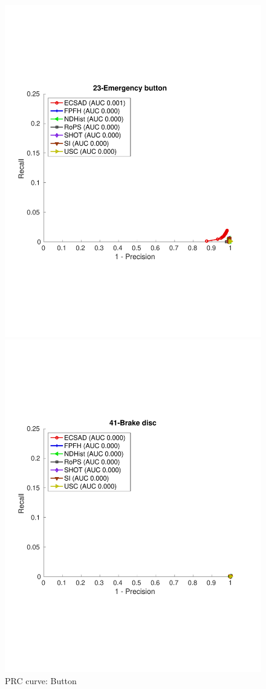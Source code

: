 \documentclass[10pt,twocolumn,letterpaper]{article}
\begin{document}
\begin{figure}[h]
\begin{minipage}[b]{.3\textwidth}
\includegraphics[clip, trim=0.7cm 6cm 0.7cm 6cm,width=1.0\linewidth, height= 1.0\linewidth, keepaspectratio]{img/23-Emergency_button_L2_RATIO_zoom.pdf} 
\caption{PRC curve: Button }\label{fig:button}
\end{minipage}\qquad
\begin{minipage}[b]{.3\textwidth}
\includegraphics[clip, trim=0.7cm 6cm 0.7cm 6cm,width=1.0\linewidth, height= 1.0\linewidth, keepaspectratio]{img/41-Brake_disc_L2_RATIO_zoom.pdf}

\end{minipage}
\end{figure}
\end{document}

